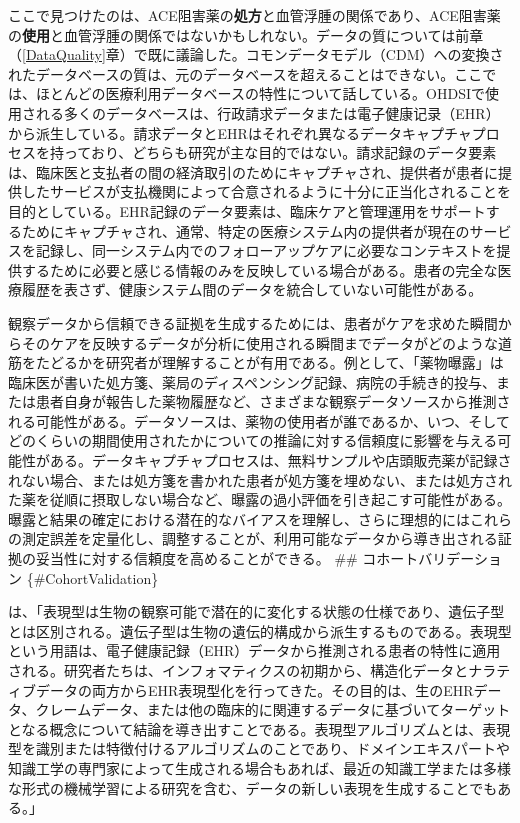 \documentclass[
  11pt]{book}
\theoremstyle{definition}
\theoremstyle{definition}
\theoremstyle{definition}
\theoremstyle{definition}
\theoremstyle{remark}
\begin{document}
ここで見つけたのは、ACE阻害薬の\textbf{処方}と血管浮腫の関係であり、ACE阻害薬の\textbf{使用}と血管浮腫の関係ではないかもしれない。データの質については前章（\ref{DataQuality}章）で既に議論した。コモンデータモデル（CDM）への変換されたデータベースの質は、元のデータベースを超えることはできない。ここでは、ほとんどの医療利用データベースの特性について話している。OHDSIで使用される多くのデータベースは、行政請求データまたは電子健康记录（EHR）から派生している。請求データとEHRはそれぞれ異なるデータキャプチャプロセスを持っており、どちらも研究が主な目的ではない。請求記録のデータ要素は、臨床医と支払者の間の経済取引のためにキャプチャされ、提供者が患者に提供したサービスが支払機関によって合意されるように十分に正当化されることを目的としている。EHR記録のデータ要素は、臨床ケアと管理運用をサポートするためにキャプチャされ、通常、特定の医療システム内の提供者が現在のサービスを記録し、同一システム内でのフォローアップケアに必要なコンテキストを提供するために必要と感じる情報のみを反映している場合がある。患者の完全な医療履歴を表さず、健康システム間のデータを統合していない可能性がある。

観察データから信頼できる証拠を生成するためには、患者がケアを求めた瞬間からそのケアを反映するデータが分析に使用される瞬間までデータがどのような道筋をたどるかを研究者が理解することが有用である。例として、「薬物曝露」は臨床医が書いた処方箋、薬局のディスペンシング記録、病院の手続き的投与、または患者自身が報告した薬物履歴など、さまざまな観察データソースから推測される可能性がある。データソースは、薬物の使用者が誰であるか、いつ、そしてどのくらいの期間使用されたかについての推論に対する信頼度に影響を与える可能性がある。データキャプチャプロセスは、無料サンプルや店頭販売薬が記録されない場合、または処方箋を書かれた患者が処方箋を埋めない、または処方された薬を従順に摂取しない場合など、曝露の過小評価を引き起こす可能性がある。曝露と結果の確定における潜在的なバイアスを理解し、さらに理想的にはこれらの測定誤差を定量化し、調整することが、利用可能なデータから導き出される証拠の妥当性に対する信頼度を高めることができる。
\#\# コホートバリデーション \{\#CohortValidation\}

\citet{hripcsak_2017} は、「表現型は生物の観察可能で潜在的に変化する状態の仕様であり、遺伝子型とは区別される。遺伝子型は生物の遺伝的構成から派生するものである。表現型という用語は、電子健康記録（EHR）データから推測される患者の特性に適用される。研究者たちは、インフォマティクスの初期から、構造化データとナラティブデータの両方からEHR表現型化を行ってきた。その目的は、生のEHRデータ、クレームデータ、または他の臨床的に関連するデータに基づいてターゲットとなる概念について結論を導き出すことである。表現型アルゴリズムとは、表現型を識別または特徴付けるアルゴリズムのことであり、ドメインエキスパートや知識工学の専門家によって生成される場合もあれば、最近の知識工学または多様な形式の機械学習による研究を含む、データの新しい表現を生成することでもある。」
\end{document}
